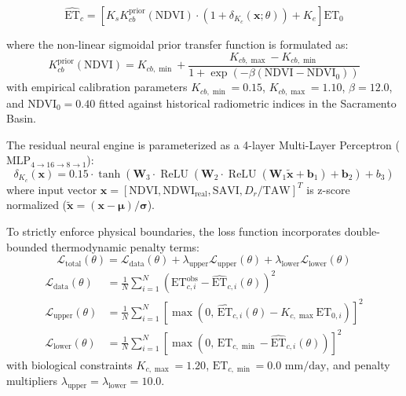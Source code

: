 \documentclass[sn-mathphys-num,Numbered]{sn-jnl}
\begin{document}
\begin{equation}
\widehat{\mathrm{ET}}_c = \left[ K_s K_{cb}^{\text{prior}}(\mathrm{NDVI}) \cdot \left(1 + \delta_{K_c}(\mathbf{x}; \theta)\right) + K_e \right] \mathrm{ET}_0 \label{eq:piml_etc_residual}
\end{equation}

where the non-linear sigmoidal prior transfer function is formulated as:
\begin{equation}
K_{cb}^{\text{prior}}(\mathrm{NDVI}) = K_{cb,\min} + \frac{K_{cb,\max} - K_{cb,\min}}{1 + \exp\left(-\beta \left(\mathrm{NDVI} - \mathrm{NDVI}_0\right)\right)} \label{eq:sigmoid_prior}
\end{equation}
with empirical calibration parameters $K_{cb,\min} = 0.15$, $K_{cb,\max} = 1.10$, $\beta = 12.0$, and $\mathrm{NDVI}_0 = 0.40$ fitted against historical radiometric indices in the Sacramento Basin.

The residual neural engine is parameterized as a 4-layer Multi-Layer Perceptron ($\text{MLP}_{4 \to 16 \to 8 \to 1}$):
\begin{equation}
\delta_{K_c}(\mathbf{x}) = 0.15 \cdot \tanh\left( \mathbf{W}_3 \cdot \operatorname{ReLU}\left( \mathbf{W}_2 \cdot \operatorname{ReLU}\left( \mathbf{W}_1 \widetilde{\mathbf{x}} + \mathbf{b}_1 \right) + \mathbf{b}_2 \right) + b_3 \right) \label{eq:mlp_residual}
\end{equation}
where input vector $\mathbf{x} = [\mathrm{NDVI}, \mathrm{NDWI}_{\text{real}}, \mathrm{SAVI}, D_r / \mathrm{TAW}]^T$ is z-score normalized ($\widetilde{\mathbf{x}} = (\mathbf{x} - \boldsymbol{\mu})/\boldsymbol{\sigma}$).

To strictly enforce physical boundaries, the loss function incorporates double-bounded thermodynamic penalty terms:
\begin{equation}
\mathcal{L}_{\text{total}}(\theta) = \mathcal{L}_{\text{data}}(\theta) + \lambda_{\text{upper}} \mathcal{L}_{\text{upper}}(\theta) + \lambda_{\text{lower}} \mathcal{L}_{\text{lower}}(\theta) \label{eq:piml_loss_total}
\end{equation}
\begin{align}
\mathcal{L}_{\text{data}}(\theta) &= \frac{1}{N}\sum_{i=1}^N \left( \mathrm{ET}_{c, i}^{\text{obs}} - \widehat{\mathrm{ET}}_{c, i}(\theta) \right)^2 \label{eq:loss_data} \\
\mathcal{L}_{\text{upper}}(\theta) &= \frac{1}{N}\sum_{i=1}^N \left[ \max\left( 0, \, \widehat{\mathrm{ET}}_{c, i}(\theta) - K_{c,\max} \mathrm{ET}_{0, i} \right) \right]^2 \label{eq:loss_upper} \\
\mathcal{L}_{\text{lower}}(\theta) &= \frac{1}{N}\sum_{i=1}^N \left[ \max\left( 0, \, \mathrm{ET}_{c,\min} - \widehat{\mathrm{ET}}_{c, i}(\theta) \right) \right]^2 \label{eq:loss_lower}
\end{align}
with biological constraints $K_{c,\max} = 1.20$, $\mathrm{ET}_{c,\min} = 0.0\text{ mm/day}$, and penalty multipliers $\lambda_{\text{upper}} = \lambda_{\text{lower}} = 10.0$.
\end{document}
